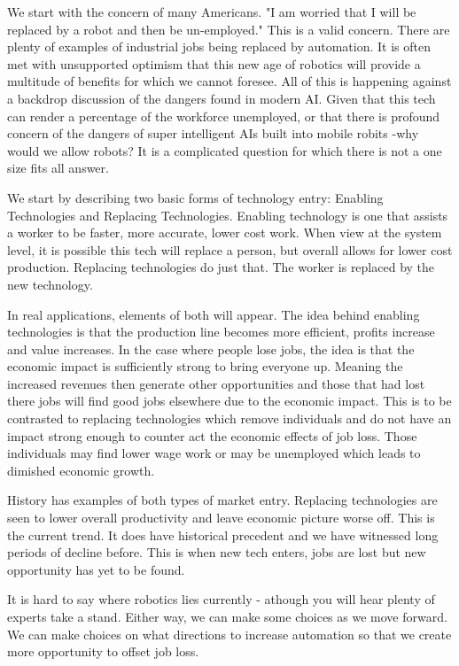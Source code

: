 We start with the concern of many Americans. "I am worried that I will
be replaced by a robot and then be un-employed." This is a valid
concern. There are plenty of examples of industrial jobs being replaced
by automation. It is often met with unsupported optimism that this new
age of robotics will provide a multitude of benefits for which we cannot
foresee. All of this is happening against a backdrop discussion of the
dangers found in modern AI. Given that this tech can render a percentage
of the workforce unemployed, or that there is profound concern of the
dangers of super intelligent AIs built into mobile robits -why would we
allow robots? It is a complicated question for which there is not a one
size fits all answer.

We start by describing two basic forms of technology entry: Enabling
Technologies and Replacing Technologies. Enabling technology is one that
assists a worker to be faster, more accurate, lower cost work. When view
at the system level, it is possible this tech will replace a person, but
overall allows for lower cost production. Replacing technologies do just
that. The worker is replaced by the new technology.

In real applications, elements of both will appear. The idea behind
enabling technologies is that the production line becomes more
efficient, profits increase and value increases. In the case where
people lose jobs, the idea is that the economic impact is sufficiently
strong to bring everyone up. Meaning the increased revenues then
generate other opportunities and those that had lost there jobs will
find good jobs elsewhere due to the economic impact. This is to be
contrasted to replacing technologies which remove individuals and do not
have an impact strong enough to counter act the economic effects of job
loss. Those individuals may find lower wage work or may be unemployed
which leads to dimished economic growth.

History has examples of both types of market entry. Replacing
technologies are seen to lower overall productivity and leave economic
picture worse off. This is the current trend. It does have historical
precedent and we have witnessed long periods of decline before. This is
when new tech enters, jobs are lost but new opportunity has yet to be
found.

It is hard to say where robotics lies currently - athough you will hear
plenty of experts take a stand. Either way, we can make some choices as
we move forward. We can make choices on what directions to increase
automation so that we create more opportunity to offset job loss.

